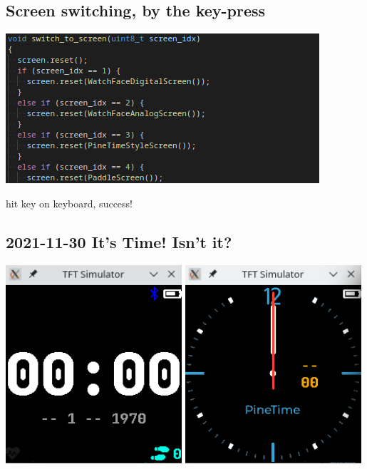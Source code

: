 \documentclass{beamer}
\begin{document}
\subsection{Screen switching, by the key-press}
\begin{frame}{}
  \centering\includegraphics[width=\textwidth]{../switching_screens_function}

  hit key on keyboard, success!
\end{frame}

\subsection{2021-11-30 It's Time! Isn't it?}
\begin{frame}{}
  \centering\includegraphics[width=0.49\textwidth]{../2021-11-30_WatchFaceDigital}
  \centering\includegraphics[width=0.49\textwidth]{../2021-11-30_WatchFaceAnalog}
\end{frame}
\end{document}
